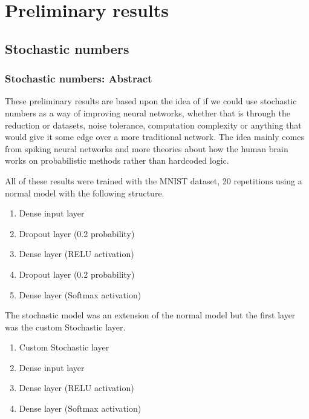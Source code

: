 \documentclass[a4paper,oneside,phd,etd]{BYUPhys}
\begin{document}


\chapter{Preliminary results}
\section{Stochastic numbers}
\subsection{Stochastic numbers: Abstract}
These preliminary results are based upon the idea of if we could use stochastic numbers as a way of improving neural networks, whether that is through the reduction or datasets, noise tolerance, computation complexity or anything that would give it some edge over a more traditional network.
The idea mainly comes from spiking neural networks and more theories about how the human brain works on probabilistic methods rather than hardcoded logic.

All of these results were trained with the MNIST dataset, 20 repetitions using a normal model with the following structure.
\begin{enumerate}
    \itemsep0em
    \item Dense input layer
    \item Dropout layer (0.2 probability)
    \item Dense layer (RELU activation)
    \item Dropout layer (0.2 probability)
    \item Dense layer (Softmax activation)
\end{enumerate}
The stochastic model was an extension of the normal model but the first layer was the custom Stochastic layer.
\begin{enumerate}
    \itemsep0em
    \item Custom Stochastic layer
    \item Dense input layer
    \item Dense layer (RELU activation)
    \item Dense layer (Softmax activation)
\end{enumerate}
\end{document}
